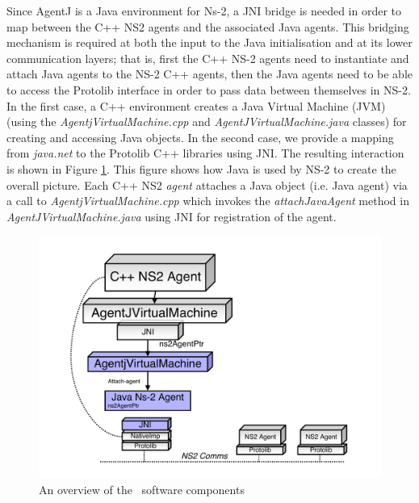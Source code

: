 Since AgentJ is a Java environment for Ns-2, a JNI bridge is needed in 
order to map between the C++ NS2 agents and the associated Java 
agents. This bridging mechanism is required at both the input to
the Java initialisation and at its lower communication layers; that is, 
first the C++ NS-2 agents need to instantiate and attach Java 
agents to the NS-2 C++ agents, then the Java agents need to be able to
access the Protolib interface in order to pass data between themselves in NS-2.
In the first case, a C++ environment creates a Java Virtual Machine 
(JVM) (using the \emph{AgentjVirtualMachine.cpp} and 
\emph{AgentJVirtualMachine.java} classes) for 
creating and accessing Java objects.  In the second case, we provide a 
mapping from \emph{java.net} to the Protolib C++ libraries 
using JNI.  The resulting interaction is shown 
in Figure \ref{intro:fig:impoverview}.  This figure shows how Java 
is used by NS-2 to create the overall picture.  Each C++ NS2 \emph{agent} 
attaches a Java object (i.e. Java agent) via a call to 
\emph{AgentjVirtualMachine.cpp} which invokes the \emph{attachJavaAgent} 
method in \emph{AgentJVirtualMachine.java} using JNI for registration of 
the agent.  


\begin{figure}
\centering
\includegraphics[scale=0.4]{images/impoverview}
\caption{An overview of the \agentj~software components} 
\label{intro:fig:impoverview}
\end{figure}


